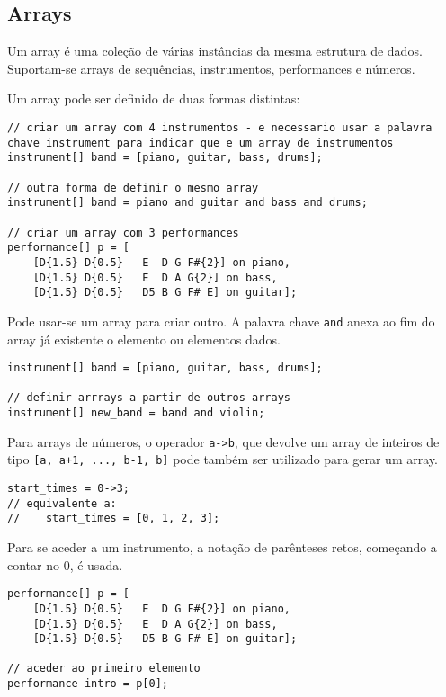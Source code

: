 \documentclass{article}
\begin{document}
\subsection{Arrays}
Um array é uma coleção de várias instâncias da mesma estrutura de dados. Suportam-se arrays de sequências, instrumentos, performances e números.

Um array pode ser definido de duas formas distintas:
\begin{lstlisting} 
// criar um array com 4 instrumentos - e necessario usar a palavra chave instrument para indicar que e um array de instrumentos
instrument[] band = [piano, guitar, bass, drums];

// outra forma de definir o mesmo array
instrument[] band = piano and guitar and bass and drums;

// criar um array com 3 performances
performance[] p = [
    [D{1.5} D{0.5}   E  D G F#{2}] on piano, 
    [D{1.5} D{0.5}   E  D A G{2}] on bass,
    [D{1.5} D{0.5}   D5 B G F# E] on guitar];
\end{lstlisting} 

Pode usar-se um array para criar outro. A palavra chave \texttt{and} anexa ao fim do array já existente o elemento ou elementos dados.  %

\begin{lstlisting} 
instrument[] band = [piano, guitar, bass, drums];

// definir arrrays a partir de outros arrays
instrument[] new_band = band and violin;
\end{lstlisting} 

Para arrays de números, o operador \texttt{a->b}, que devolve um array de inteiros de tipo \texttt{[a, a+1, ..., b-1, b]} pode também ser utilizado para gerar um array.
\begin{lstlisting}
start_times = 0->3;
// equivalente a:
//    start_times = [0, 1, 2, 3];
\end{lstlisting}

Para se aceder a um instrumento, a notação de parênteses retos, começando a contar no 0, é usada. %
\begin{lstlisting} 
performance[] p = [
    [D{1.5} D{0.5}   E  D G F#{2}] on piano, 
    [D{1.5} D{0.5}   E  D A G{2}] on bass,
    [D{1.5} D{0.5}   D5 B G F# E] on guitar];
    
// aceder ao primeiro elemento
performance intro = p[0];

\end{lstlisting}
\end{document}
